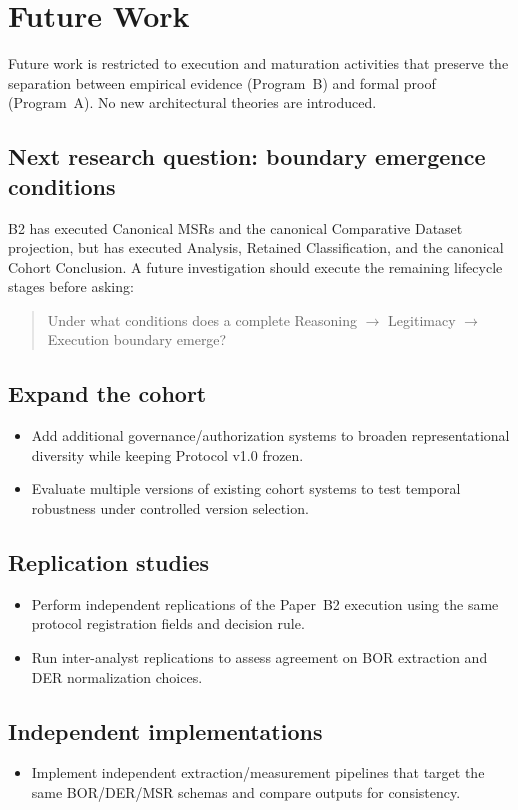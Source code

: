 \section{Future Work}
\label{sec:future-work}
Future work is restricted to execution and maturation activities that preserve the separation between empirical evidence (Program~B) and formal proof (Program~A). No new architectural theories are introduced.

\subsection{Next research question: boundary emergence conditions}
B2 has executed Canonical MSRs and the canonical Comparative Dataset projection, but has executed Analysis, Retained Classification, and the canonical Cohort Conclusion. A future investigation should execute the remaining lifecycle stages before asking:
\begin{quote}
Under what conditions does a complete Reasoning $\rightarrow$ Legitimacy $\rightarrow$ Execution boundary emerge?
\end{quote}

\subsection{Expand the cohort}
\begin{itemize}
  \item Add additional governance/authorization systems to broaden representational diversity while keeping Protocol v1.0 frozen.
  \item Evaluate multiple versions of existing cohort systems to test temporal robustness under controlled version selection.
\end{itemize}

\subsection{Replication studies}
\begin{itemize}
  \item Perform independent replications of the Paper~B2 execution using the same protocol registration fields and decision rule.
  \item Run inter-analyst replications to assess agreement on BOR extraction and DER normalization choices.
\end{itemize}

\subsection{Independent implementations}
\begin{itemize}
  \item Implement independent extraction/measurement pipelines that target the same BOR/DER/MSR schemas and compare outputs for consistency.
\end{itemize}

